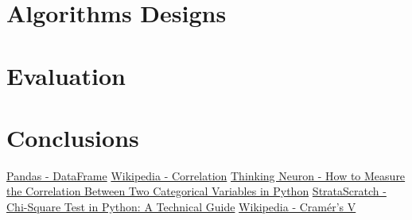 \documentclass[runningheads]{paper}
\begin{document}
\section{Algorithms Designs}


\section{Evaluation}

\section{Conclusions}


\pagebreak

\begin{thebibliography}{8}
    \bibitem{}
    \href{https://pandas.pydata.org/docs/reference/api/pandas.DataFrame.html}{Pandas - DataFrame}
    \bibitem{}
    \href{https://en.wikipedia.org/wiki/Correlation}{Wikipedia - Correlation}
    \bibitem{}
    \href{https://thinkingneuron.com/how-to-measure-the-correlation-between-two-categorical-variables-in-python/}{Thinking Neuron - How to Measure the Correlation Between Two Categorical Variables in Python}
    \bibitem{}
    \href{https://www.stratascratch.com/blog/chi-square-test-in-python-a-technical-guide/}{StrataScratch - Chi-Square Test in Python: A Technical Guide}
    \bibitem{}
    \href{https://en.wikipedia.org/wiki/Cram\%C3\%A9r\%27s\_V}{Wikipedia - Cramér's V}
    \bibitem{}
    
    \end{thebibliography}
\end{document}
